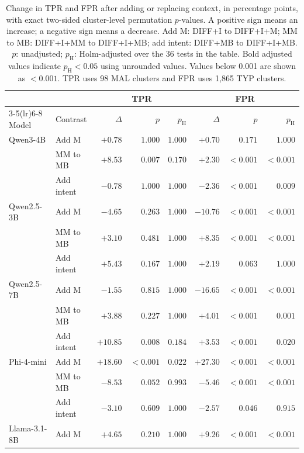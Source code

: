 \documentclass[a4paper,fleqn]{cas-dc}
\begin{document}
\begin{table}[t]
\centering\small
\caption{Change in TPR and FPR after adding or replacing context, in percentage points, with exact two-sided cluster-level permutation $p$-values. A positive sign means an increase; a negative sign means a decrease. Add M: DIFF+I to DIFF+I+M; MM to MB: DIFF+I+MM to DIFF+I+MB; add intent: DIFF+MB to DIFF+I+MB. $p$: unadjusted; $p_{\mathrm{H}}$: Holm-adjusted over the 36 tests in the table. Bold adjusted values indicate $p_{\mathrm{H}} < 0.05$ using unrounded values. Values below 0.001 are shown as $<0.001$. TPR uses 98 MAL clusters and FPR uses 1,865 TYP clusters.}
\label{tab:contrast}
\begin{tabular}{llrrrrrr}
\toprule
 & & \multicolumn{3}{c}{TPR} & \multicolumn{3}{c}{FPR} \\
\cmidrule(lr){3-5}\cmidrule(lr){6-8}
Model & Contrast & $\Delta$ & $p$ & $p_{\mathrm{H}}$ & $\Delta$ & $p$ & $p_{\mathrm{H}}$ \\
\midrule
Qwen3-4B & Add M & $+0.78$ & $1.000$ & $1.000$ & $+0.70$ & $0.171$ & $1.000$ \\
 & MM to MB & $+8.53$ & $0.007$ & $0.170$ & $+2.30$ & $<0.001$ & $\mathbf{<0.001}$ \\
 & Add intent & $-0.78$ & $1.000$ & $1.000$ & $-2.36$ & $<0.001$ & $\mathbf{0.009}$ \\
Qwen2.5-3B & Add M & $-4.65$ & $0.263$ & $1.000$ & $-10.76$ & $<0.001$ & $\mathbf{<0.001}$ \\
 & MM to MB & $+3.10$ & $0.481$ & $1.000$ & $+8.35$ & $<0.001$ & $\mathbf{<0.001}$ \\
 & Add intent & $+5.43$ & $0.167$ & $1.000$ & $+2.19$ & $0.063$ & $1.000$ \\
Qwen2.5-7B & Add M & $-1.55$ & $0.815$ & $1.000$ & $-16.65$ & $<0.001$ & $\mathbf{<0.001}$ \\
 & MM to MB & $+3.88$ & $0.227$ & $1.000$ & $+4.01$ & $<0.001$ & $\mathbf{0.001}$ \\
 & Add intent & $+10.85$ & $0.008$ & $0.184$ & $+3.53$ & $<0.001$ & $\mathbf{0.020}$ \\
Phi-4-mini & Add M & $+18.60$ & $<0.001$ & $\mathbf{0.022}$ & $+27.30$ & $<0.001$ & $\mathbf{<0.001}$ \\
 & MM to MB & $-8.53$ & $0.052$ & $0.993$ & $-5.46$ & $<0.001$ & $\mathbf{<0.001}$ \\
 & Add intent & $-3.10$ & $0.609$ & $1.000$ & $-2.57$ & $0.046$ & $0.915$ \\
Llama-3.1-8B & Add M & $+4.65$ & $0.210$ & $1.000$ & $+9.26$ & $<0.001$ & $\mathbf{<0.001}$ \\

\end{tabular}
\end{table}
\end{document}
